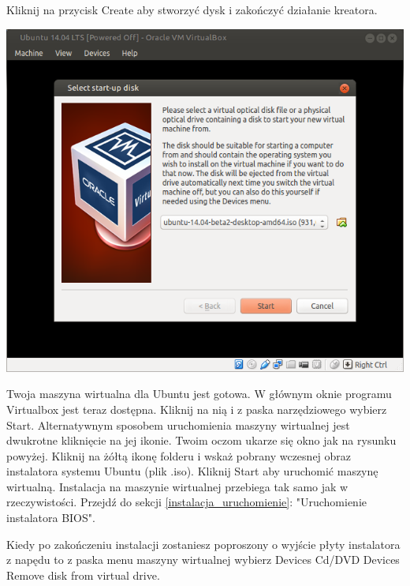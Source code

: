 Kliknij na przycisk \textcolor{ubuntu_orange}{Create} aby stworzyć dysk i zakończyć działanie kreatora.

\clearpage
\begin{center}
	\includegraphics[width=\linewidth]{images/virtualbox_start.png}
\end{center}

Twoja maszyna wirtualna dla Ubuntu jest gotowa. W głównym oknie programu Virtualbox jest teraz dostępna. Kliknij na nią i z paska narzędziowego wybierz \textcolor{ubuntu_orange}{Start}. Alternatywnym sposobem uruchomienia maszyny wirtualnej jest dwukrotne kliknięcie na jej ikonie. Twoim oczom ukarze się okno jak na rysunku powyżej. Kliknij na żółtą ikonę folderu i wskaż pobrany wczesnej obraz instalatora systemu Ubuntu (plik .iso). Kliknij \textcolor{ubuntu_orange}{Start} aby uruchomić maszynę wirtualną. Instalacja na maszynie wirtualnej przebiega tak samo jak w rzeczywistości. Przejdź do sekcji \ref{instalacja_uruchomienie}: "Uruchomienie instalatora BIOS".

Kiedy po zakończeniu instalacji zostaniesz poproszony o wyjście płyty instalatora z napędu to z paska menu maszyny wirtualnej wybierz Devices Cd/DVD Devices Remove disk from virtual drive.
\clearpage
